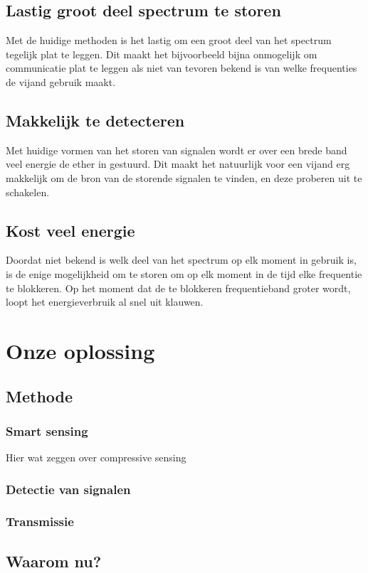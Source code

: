 \documentclass[oneside, a4paper, openany]{memoir}
\begin{document}
\section{Lastig groot deel spectrum te storen}
Met de huidige methoden is het lastig om een groot deel van het spectrum tegelijk plat te leggen. Dit maakt het bijvoorbeeld bijna onmogelijk om communicatie plat te leggen als niet van tevoren bekend is van welke frequenties de vijand gebruik maakt.

\section{Makkelijk te detecteren}
Met huidige vormen van het storen van signalen wordt er over een brede band veel energie de ether in gestuurd. Dit maakt het natuurlijk voor een vijand erg makkelijk om de bron van de storende signalen te vinden, en deze proberen uit te schakelen.

\section{Kost veel energie}
Doordat niet bekend is welk deel van het spectrum op elk moment in gebruik is, is de enige mogelijkheid om te storen om op elk moment in de tijd elke frequentie te blokkeren. Op het moment dat de te blokkeren frequentieband groter wordt, loopt het energieverbruik al snel uit klauwen.

\chapter{Onze oplossing}
\section{Methode}
\subsection{Smart sensing}
Hier wat zeggen over compressive sensing
\subsection{Detectie van signalen}
\subsection{Transmissie}

\section{Waarom nu?}
\end{document}
